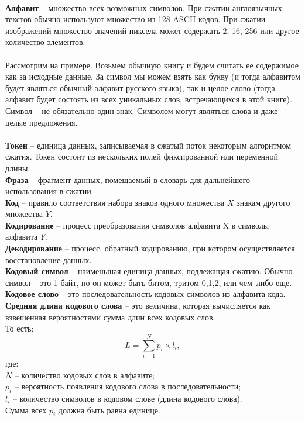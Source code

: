 \\\textbf{Алфавит} -- множество всех возможных символов. При сжатии англоязычных текстов обычно используют множество из 128 ASCII кодов. При сжатии изображений множество значений пиксела может содержать 2, 16, 256 или другое количество элементов.
\\
\\Рассмотрим на примере. Возьмем обычную книгу и будем считать ее содержимое как за исходные данные. За символ мы можем взять как букву (и тогда алфавитом будет являться обычный алфавит русского языка), так и целое слово (тогда алфавит будет состоять из всех уникальных слов, встречающихся в этой книге). Символ -- не обязательно один знак. Символом могут являться слова и даже целые предложения.\\
\\\textbf{Токен} -- единица данных, записываемая в сжатый поток некоторым алгоритмом сжатия. Токен состоит из нескольких полей фиксированной или переменной длины.
\\\textbf{Фраза} -- фрагмент данных, помещаемый в словарь для дальнейшего использования в сжатии.
\\\textbf{Код} -- правило соответствия набора знаков одного множества $X$ знакам другого множества $Y$.
\\\textbf{Кодирование} -- процесс преобразования символов алфавита $Х$ в символы алфавита $Y$.
\\\textbf{Декодирование} -- процесс, обратный кодированию, при котором осуществляется восстановление данных.
\\\textbf{Кодовый символ} -- наименьшая единица данных, подлежащая сжатию. Обычно символ – это 1 байт, но он может быть битом, тритом {0,1,2}, или чем--либо еще.
\\\textbf{Кодовое слово} -- это последовательность кодовых символов из алфавита кода.
\\\textbf{Средняя длина кодового слова} -- это величина, которая вычисляется как взвешенная вероятностями сумма длин всех кодовых слов.
\\То есть:
$$ L = \sum_{i=1}^{N}p_{i}\times l_{i},$$ где: 
\\$N$ -- количество кодовых слов в алфавите;
\\$p_{i}$ -- вероятность появления кодового слова в последовательности;
\\$l_{i}$ -- количество символов в кодовом слове (длина кодового слова).
\\Сумма всех $p_{i}$ должна быть равна единице.
\\
